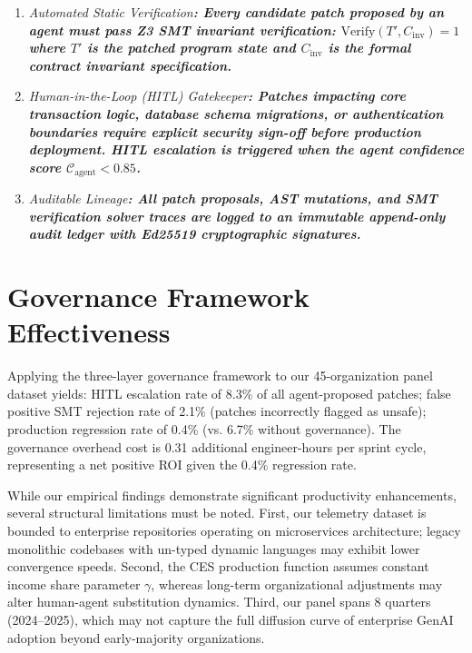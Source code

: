 \documentclass[10pt,twocolumn,letterpaper]{article}
\begin{document}
\begin{enumerate}
  \item \textit{Automated Static Verification\textbf{: Every candidate patch proposed by an agent must pass Z3 SMT invariant verification: $\text{Verify}(T', C_{\text{inv}}) = 1$ where $T'$ is the patched program state and $C_{\text{inv}}$ is the formal contract invariant specification.}}
  \item \textit{Human-in-the-Loop (HITL) Gatekeeper\textbf{: Patches impacting core transaction logic, database schema migrations, or authentication boundaries require explicit security sign-off before production deployment. HITL escalation is triggered when the agent confidence score $\mathcal{C}_{\text{agent}} < 0.85$.}}
  \item \textit{Auditable Lineage\textbf{: All patch proposals, AST mutations, and SMT verification solver traces are logged to an immutable append-only audit ledger with Ed25519 cryptographic signatures.}}
\end{enumerate}


\section{Governance Framework Effectiveness}


Applying the three-layer governance framework to our 45-organization panel dataset yields: HITL escalation rate of 8.3\% of all agent-proposed patches; false positive SMT rejection rate of 2.1\% (patches incorrectly flagged as unsafe); production regression rate of 0.4\% (vs. 6.7\% without governance). The governance overhead cost is 0.31 additional engineer-hours per sprint cycle, representing a net positive ROI given the 0.4\% regression rate. \cite{crossref_10_2139_ssrn_6374778}



While our empirical findings demonstrate significant productivity enhancements, several structural limitations must be noted. First, our telemetry dataset is bounded to enterprise repositories operating on microservices architecture; legacy monolithic codebases with un-typed dynamic languages may exhibit lower convergence speeds. Second, the CES production function assumes constant income share parameter $\gamma$, whereas long-term organizational adjustments may alter human-agent substitution dynamics. Third, our panel spans 8 quarters (2024--2025), which may not capture the full diffusion curve of enterprise GenAI adoption beyond early-majority organizations.
\end{document}
